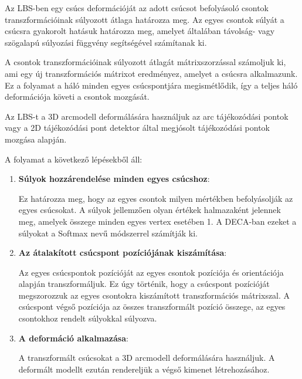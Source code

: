 \documentclass[12pt,a4]{article}
\begin{document}
                Az LBS-ben egy csúcs deformációját az adott csúcsot befolyásoló csontok transzformációinak súlyozott átlaga határozza meg. Az egyes csontok súlyát a csúcsra gyakorolt hatásuk határozza meg, amelyet általában távolság- vagy szögalapú súlyozási függvény segítségével számítanak ki.
                
                A csontok transzformációinak súlyozott átlagát mátrixszorzással számoljuk ki, ami egy új transzformációs mátrixot eredményez, amelyet a csúcsra alkalmazunk. Ez a folyamat a háló minden egyes csúcspontjára megismétlődik, így a teljes háló deformációja követi a csontok mozgását.
                
                Az LBS-t a 3D arcmodell deformálására használjuk az arc tájékozódási pontok vagy a 2D tájékozódási pont detektor által megjósolt tájékozódási pontok mozgása alapján.

                A folyamat a következő lépésekből áll:
                    \begin{enumerate}
                        \item \textbf{Súlyok hozzárendelése minden egyes csúcshoz}: 
                        
                        Ez határozza meg, hogy az egyes csontok milyen mértékben befolyásolják az egyes csúcsokat. 
                    	A súlyok jellemzően olyan értékek halmazaként jelennek meg, amelyek összege minden egyes vertex esetében 1. A DECA-ban ezeket a súlyokat a Softmax nevű módszerrel számítják ki.
                    
                        \item \textbf{Az átalakított csúcspont pozíciójának kiszámítása}: 
                        
                        Az egyes csúcspontok pozícióját az egyes csontok pozíciója és orientációja alapján transzformáljuk. 
                    	Ez úgy történik, hogy a csúcspont pozícióját megszorozzuk az egyes csontokra kiszámított transzformációs mátrixszal. 
                    	A csúcspont végső pozíciója az összes transzformált pozíció összege, az egyes csontokhoz rendelt súlyokkal súlyozva.
                    
                        \item \textbf{A deformáció alkalmazása}: 
                        
                        A transzformált csúcsokat a 3D arcmodell deformálására használjuk. A deformált modellt ezután rendereljük a végső kimenet létrehozásához.
                    \end{enumerate}
\end{document}
